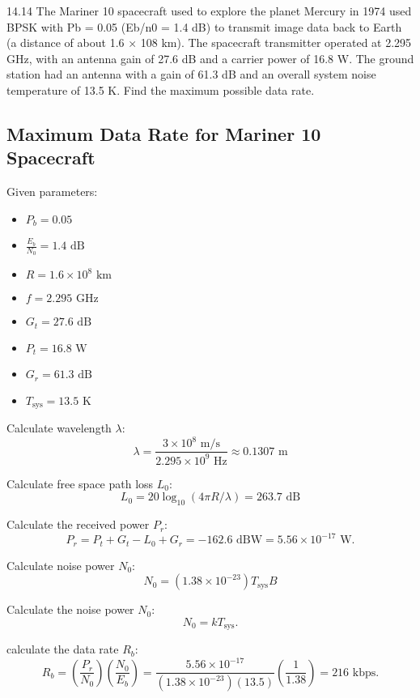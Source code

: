 \documentclass[cn,12pt]{homework}
\begin{document}
\newpage

14.14 The Mariner 10 spacecraft used to explore the planet Mercury in 1974 used BPSK with Pb = 0.05
(Eb/n0 = 1.4 dB) to transmit image data back to Earth (a distance of about 1.6 × 108 km). The
spacecraft transmitter operated at 2.295 GHz, with an antenna gain of 27.6 dB and a carrier power
of 16.8 W. The ground station had an antenna with a gain of 61.3 dB and an overall system noise
temperature of 13.5 K. Find the maximum possible data rate.
\begin{solution}
  \section*{Maximum Data Rate for Mariner 10 Spacecraft}

Given parameters:
\begin{itemize}
    \item \( P_b = 0.05 \)
    \item \( \frac{E_b}{N_0} = 1.4 \text{ dB} \)
    \item \( R = 1.6 \times 10^8 \text{ km} \)
    \item \( f = 2.295 \text{ GHz} \)
    \item \( G_t = 27.6 \text{ dB} \)
    \item \( P_t = 16.8 \text{ W} \)
    \item \( G_r = 61.3 \text{ dB} \)
    \item \( T_{\text{sys}} = 13.5 \text{ K} \)
\end{itemize}

Calculate wavelength \( \lambda \):
\[ \lambda = \frac{3 \times 10^8 \text{ m/s}}{2.295 \times 10^9 \text{ Hz}} \approx 0.1307 \text{ m} \]

Calculate free space path loss \( L_0 \):
\[ L_0 = 20 \log_{10}(4\pi R/\lambda) =263.7 \text{ dB} \]

Calculate the received power \( P_r \):
\[
P_r = P_t + G_t - L_0 + G_r = -162.6 \text{ dBW} = 5.56 \times 10^{-17} \text{ W}.
\]

Calculate noise power \( N_0 \):
\[ N_0 = (1.38 \times 10^{-23}) T_{\text{sys}} B \]

Calculate the noise power \( N_0 \):
\[
N_0 = k T_{\text{sys}}.
\]

calculate the data rate \( R_b \):
\[
R_b = \left(\frac{P_r}{N_0}\right) \left(\frac{N_0}{E_b}\right) = \frac{5.56 \times 10^{-17}}{(1.38 \times 10^{-23})(13.5)} \left(\frac{1}{1.38}\right) = 216 \text{ kbps}.
\]

\end{solution}
\newpage
\end{document}
